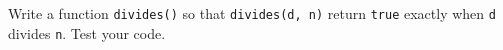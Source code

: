 Write a function \texttt{divides()} so that \texttt{divides(d, n)} return \texttt{true} exactly when \texttt{d} divides \texttt{n}. Test your code.

